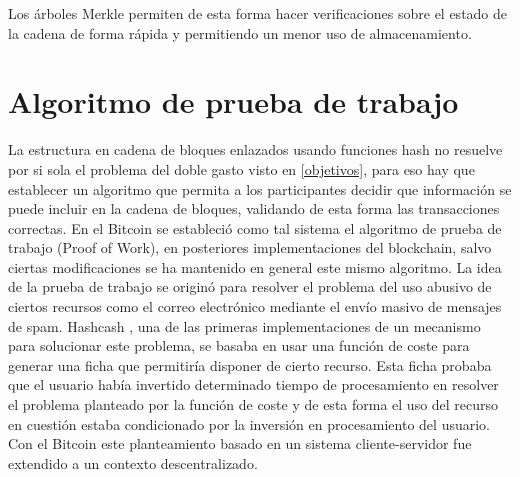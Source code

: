 Los árboles Merkle permiten de esta forma hacer verificaciones sobre el estado de la cadena de forma rápida y permitiendo un menor uso de almacenamiento.

\begin{figure}[H]
\centering
  \qquad

	\label{fig:merkle}%
\end{figure}


\section{Algoritmo de prueba de trabajo}\label{chap3:pow}
La estructura en cadena de bloques enlazados usando funciones hash no resuelve por si sola el problema del doble gasto visto en \ref{objetivos}, para eso hay que establecer un algoritmo que permita a los participantes decidir que información se puede incluir en la cadena de bloques, validando de esta forma las transacciones correctas. En el Bitcoin se estableció como tal sistema el algoritmo de prueba de trabajo (Proof of Work), en posteriores implementaciones del blockchain, salvo ciertas modificaciones se ha mantenido en general este mismo algoritmo. La idea de la prueba de trabajo se originó para resolver el problema del uso abusivo de ciertos recursos como el correo electrónico mediante el envío masivo de mensajes de spam. Hashcash \citep{hashcash}, una de las primeras implementaciones de un mecanismo para solucionar este problema, se basaba en usar una función de coste para generar una ficha que permitiría disponer de cierto recurso. Esta ficha probaba que el usuario había invertido determinado tiempo de procesamiento en resolver el problema planteado por la función de coste y de esta forma el uso del recurso en cuestión estaba condicionado por la inversión en procesamiento del usuario. Con el Bitcoin este planteamiento basado en un sistema cliente-servidor fue extendido a un contexto descentralizado.

